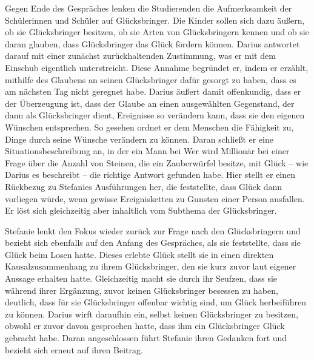 Gegen Ende des Gespräches lenken die Studierenden die Aufmerksamkeit der Schülerinnen und Schüler auf Glücksbringer. 
Die Kinder sollen sich dazu äußern, ob sie Glücksbringer besitzen, ob sie Arten von Glücksbringern kennen und ob sie daran glauben, dass Glücksbringer das Glück fördern können. 
Darius antwortet darauf mit einer zunächst zurückhaltenden Zustimmung, was er mit dem Einschub \glqq eigentlich\grqq{} unterstreicht. 
Diese Annahme begründet er, indem er erzählt, mithilfe des Glaubens an seinen Glücksbringer dafür gesorgt zu haben, dass es am nächsten Tag nicht geregnet habe. 
Darius äußert damit offenkundig, dass er der Überzeugung ist, dass der Glaube an einen ausgewählten Gegenstand, der dann als Glücksbringer dient, Ereignisse so verändern kann, dass sie den eigenen Wünschen entsprechen. 
So gesehen ordnet er dem Menschen die Fähigkeit zu, Dinge durch seine Wünsche verändern zu können. 
Daran schließt er eine Situationsbeschreibung an, in der ein Mann bei \glqq Wer wird Millionär\grqq{} bei einer Frage über die Anzahl von Steinen, die ein Zauberwürfel besitze, mit Glück -- wie Darius es beschreibt -- die richtige Antwort gefunden habe. 
Hier stellt er einen Rückbezug zu Stefanies Ausführungen her, die feststellte, dass Glück dann vorliegen würde, wenn gewisse Ereignisketten zu Gunsten einer Person ausfallen. 
Er löst sich gleichzeitig aber inhaltlich vom Subthema der Glücksbringer.

Stefanie lenkt den Fokus wieder zurück zur Frage nach den Glücksbringern und bezieht sich ebenfalls auf den Anfang des Gespräches, als sie feststellte, dass sie Glück beim Losen hatte. 
Dieses erlebte Glück stellt sie in einen direkten Kausalzusammenhang zu ihrem Glücksbringer, den sie kurz zuvor laut eigener Aussage erhalten hatte. 
Gleichzeitig macht sie durch ihr Seufzen, dass sie während ihrer Ergänzung, zuvor keinen Glücksbringer besessen zu haben, deutlich, dass für sie Glücksbringer offenbar wichtig sind, um Glück herbeiführen zu können. 
Darius wirft daraufhin ein, selbst keinen Glücksbringer zu besitzen, obwohl er zuvor davon gesprochen hatte, dass ihm ein Glücksbringer Glück gebracht habe. 
Daran angeschlossen führt Stefanie ihren Gedanken fort und bezieht sich erneut auf ihren Beitrag.

